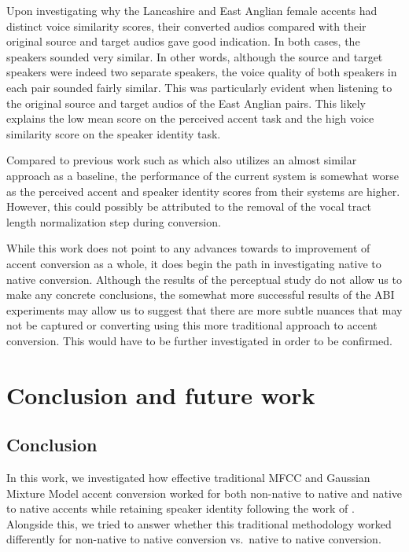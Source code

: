 \documentclass
[
    a4paper,
    twoside,
    12pt,
]
{report}
\begin{document}
Upon investigating why the Lancashire and East Anglian female accents
had distinct voice similarity scores, their converted audios compared
with their original source and target audios gave good indication. In
both cases, the speakers sounded very similar. In other words, although
the source and target speakers were indeed two separate speakers, the
voice quality of both speakers in each pair sounded fairly similar. This
was particularly evident when listening to the original source and
target audios of the East Anglian pairs. This likely explains the low
mean score on the perceived accent task and the high voice similarity
score on the speaker identity task.

Compared to previous work such as \textcite{zhao2018} which also
utilizes an almost similar approach as a baseline, the performance of
the current system is somewhat worse as the perceived accent and speaker
identity scores from their systems are higher. However, this could
possibly be attributed to the removal of the vocal tract length
normalization step during conversion.

While this work does not point to any advances towards to improvement of
accent conversion as a whole, it does begin the path in investigating
native to native conversion. Although the results of the perceptual
study do not allow us to make any concrete conclusions, the somewhat
more successful results of the ABI experiments may allow us to suggest
that there are more subtle nuances that may not be captured or
converting using this more traditional approach to accent conversion.
This would have to be further investigated in order to be confirmed.
\cleardoublepage
\chapter{Conclusion and future work}

\hypertarget{conclusion}{%
\section{Conclusion}\label{conclusion}}

In this work, we investigated how effective traditional MFCC and
Gaussian Mixture Model accent conversion worked for both non-native to
native and native to native accents while retaining speaker identity
following the work of \textcite{aryal2014}. Alongside this, we tried to
answer whether this traditional methodology worked differently for
non-native to native conversion vs.~native to native conversion.
\end{document}
